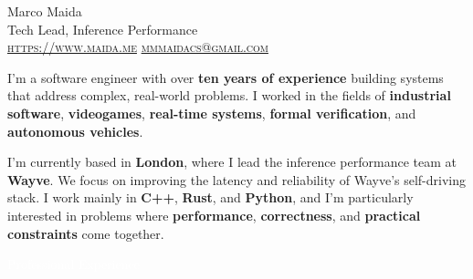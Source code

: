 \documentclass[letterpaper]{article}
\newcounter{colorCounter}
\newcommand{\sectioncolor}[1]{%
  \colorbox{%
    \ifodd\value{colorCounter}mainblue\else maingray\fi%
  }{\textcolor{white}{\strut\hspace{6pt}#1\hspace{6pt}}}%
  \stepcounter{colorCounter}%
}
\renewcommand{\section}[1]{%
  \vspace{1.5em}
  {\Large\sectioncolor{#1}}\par
  \vspace{0.8em}
}
\begin{document}
\begin{minipage}[t]{0.7\linewidth}
  {\Huge\color{mainblue}Marco Maida}\\
  {\Large\color{black!80}Tech Lead, Inference Performance}\\
  \vspace{4pt}
  \textsc{\href{https://www.maida.me}{https://www.maida.me}} \quad \textsc{\href{mailto:mmmaidacs@gmail.com}{mmmaidacs@gmail.com}}
\end{minipage}

\vspace{.5cm}

I’m a software engineer with over \textbf{ten years of experience} building systems that address complex, real-world problems. I worked in the fields of \textbf{industrial software}, \textbf{videogames}, \textbf{real-time systems},  \textbf{formal verification}, and \textbf{autonomous vehicles}.

I’m currently based in \textbf{London}, where I lead the inference performance team at \textbf{Wayve}. We focus on improving the latency and reliability of Wayve’s self-driving stack. I work mainly in \textbf{C++}, \textbf{Rust}, and \textbf{Python}, and I’m particularly interested in problems where \textbf{performance}, \textbf{correctness}, and \textbf{practical constraints} come together.

\vspace{.1cm}

\section{Professional Experience}
\end{document}
